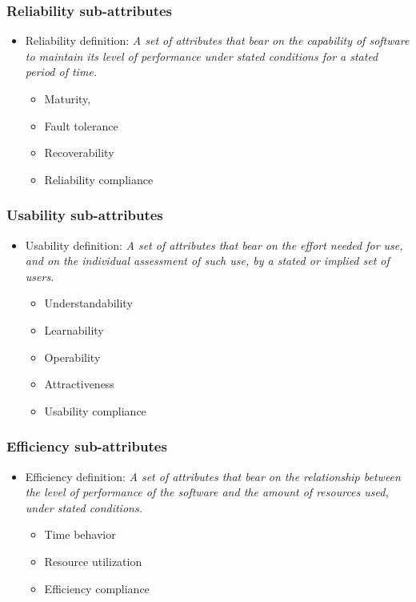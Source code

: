 \documentclass{beamer}
\begin{document}
\begin{frame}
 \frametitle{Reliability sub-attributes}
 \begin{itemize}
 \item Reliability definition: \textit{A set of attributes that bear on the capability of software to maintain its level of performance under stated conditions for a stated period of time.}
 \begin{itemize}
 \item Maturity,
 \item Fault tolerance
 \item Recoverability
 \item Reliability compliance
 \end{itemize}

 \end{itemize}
\end{frame}



\begin{frame}
 \frametitle{Usability sub-attributes}
 \begin{itemize}
 \item Usability definition: \textit{A set of attributes that bear on the effort needed for use, and on the individual assessment of such use, by a stated or implied set of users.}
 \begin{itemize}
 \item Understandability
 \item Learnability
 \item Operability
 \item Attractiveness
 \item Usability compliance

 \end{itemize}

 \end{itemize}
\end{frame}



\begin{frame}
 \frametitle{Efficiency sub-attributes}
 \begin{itemize}
 \item Efficiency definition: \textit{A set of attributes that bear on the relationship between the level of performance of the software and the amount of resources used, under stated conditions.}
 \begin{itemize}
 \item Time behavior
 \item Resource utilization
 \item Efficiency compliance

 \end{itemize}

 \end{itemize}
\end{frame}
\end{document}
